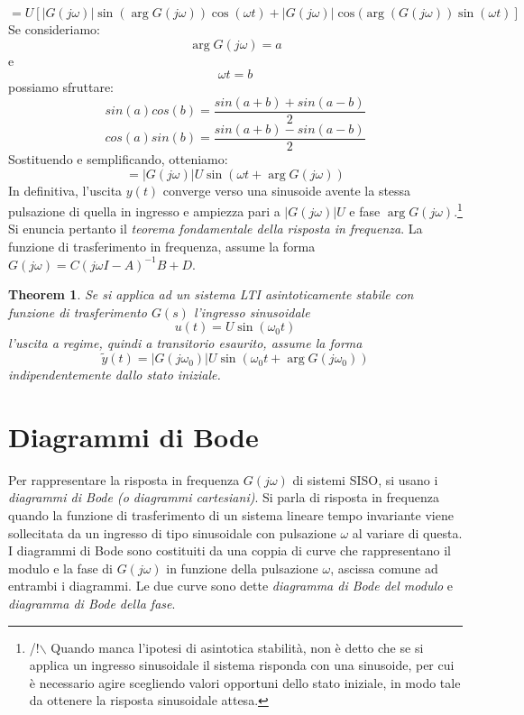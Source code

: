 \documentclass[a4paper]{report}
\begin{document}
\begin{displaymath}
  =U\left [  |G(j\omega)|\sin(\arg G(j\omega))\cos(\omega t) +
    |G(j\omega)|\cos(\arg(G(j\omega))\sin(\omega t)\right ] 
\end{displaymath}
Se consideriamo:
\[
  \arg G(j\omega) = a
\]
e
\[
  \omega t = b
\]
possiamo sfruttare:
\[
  sin(a)cos(b) = \dfrac{sin(a + b) + sin(a - b)}{2}
\]
\[
  cos(a)sin(b) = \dfrac{sin(a + b) - sin(a - b)}{2}
\]
Sostituendo e semplificando, otteniamo:
\begin{equation}\label{eq:rispfreqfdt}
  =|G(j\omega)| U \sin (\omega t+\arg G(j\omega))
\end{equation}
In definitiva, l'uscita $y(t)$ converge verso una sinusoide avente la
stessa pulsazione di quella in ingresso e ampiezza pari a
$|G(j\omega)|U$ e fase $\arg G(j\omega)$.\footnote{/!$\backslash$
  Quando manca l'ipotesi di asintotica stabilit\`a, non \`e detto che
  se si applica un ingresso sinusoidale il sistema risponda con una
  sinusoide, per cui \`e necessario agire scegliendo valori opportuni
  dello stato iniziale, in modo tale da ottenere la risposta sinusoidale attesa.}
Si enuncia pertanto il \emph{teorema fondamentale della risposta in
  frequenza}. La funzione di trasferimento in frequenza,
  assume la forma $G(j\omega)=C(j\omega I - A)^{-1}B+D$.
\newtheorem{rispinfreq}{Theorem}[chapter]
\begin{rispinfreq}
  Se si applica ad un sistema LTI asintoticamente stabile con funzione
  di trasferimento $G(s)$ l'ingresso sinusoidale
\begin{displaymath}
  u(t) = U \sin (\omega_0 t)
\end{displaymath}
l'uscita a regime, quindi a transitorio esaurito, assume la
forma
\begin{equation}\label{eq:genrispfreq} 
  \tilde{y}(t) = |G(j\omega_0)| U \sin(\omega_0 t +\arg G(j\omega_0))
\end{equation}
indipendentemente dallo stato iniziale.
\end{rispinfreq}



\section{Diagrammi di Bode}
Per rappresentare la risposta in frequenza $G(j\omega)$ di sistemi
SISO, si usano i \emph{diagrammi di Bode (o diagrammi cartesiani)}. Si
parla di risposta in frequenza quando la funzione di trasferimento di
un sistema lineare tempo invariante viene sollecitata da un ingresso
di tipo sinusoidale con pulsazione $\omega$ al variare di questa. I
diagrammi di Bode sono costituiti da una coppia di curve che
rappresentano il modulo e la fase di $G(j\omega)$ in funzione della
pulsazione  $\omega$, ascissa comune ad entrambi i diagrammi.  Le due
curve sono dette  
\emph {diagramma di Bode del modulo} e \emph{diagramma di Bode della
  fase}.
\end{document}
